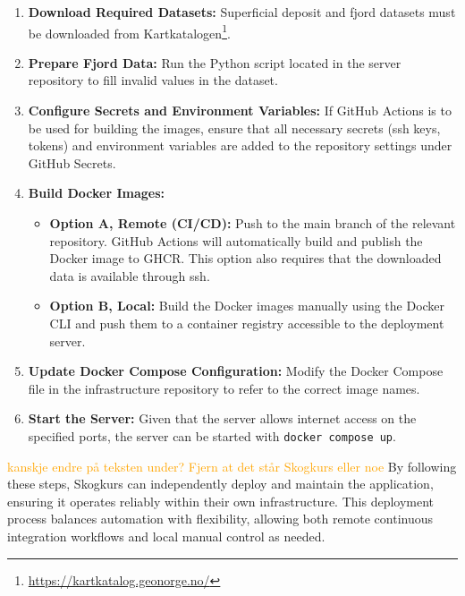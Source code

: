 \begin{enumerate}
    \item \textbf{Download Required Datasets:} Superficial deposit and fjord datasets must be downloaded from Kartkatalogen\footnote{\url{https://kartkatalog.geonorge.no/}}.

    \item \textbf{Prepare Fjord Data:} Run the Python script located in the server repository to fill invalid values in the dataset.

    \item \textbf{Configure Secrets and Environment Variables:} If GitHub Actions is to be used for building the images, ensure that all necessary secrets (\acrshort{ssh} keys, tokens) and environment variables are added to the repository settings under GitHub Secrets.

    \item \textbf{Build Docker Images:}  
    \begin{itemize}
        \item \textbf{Option A, Remote (CI/CD):} Push to the main branch of the relevant repository. GitHub Actions will automatically build and publish the Docker image to GHCR. This option also requires that the downloaded data is available through \acrshort{ssh}.
        \item \textbf{Option B, Local:} Build the Docker images manually using the Docker CLI and push them to a container registry accessible to the deployment server.
    \end{itemize}

    \item \textbf{Update Docker Compose Configuration:} Modify the Docker Compose file in the infrastructure repository to refer to the correct image names.

    \item \textbf{Start the Server:} Given that the server allows internet access on the specified ports, the server can be started with \texttt{docker compose up}.
\end{enumerate}

\textcolor{orange}{kanskje endre på teksten under? Fjern at det står Skogkurs eller noe}
By following these steps, Skogkurs can independently deploy and maintain the application, ensuring it operates reliably within their own infrastructure. This deployment process balances automation with flexibility, allowing both remote continuous integration workflows and local manual control as needed.

